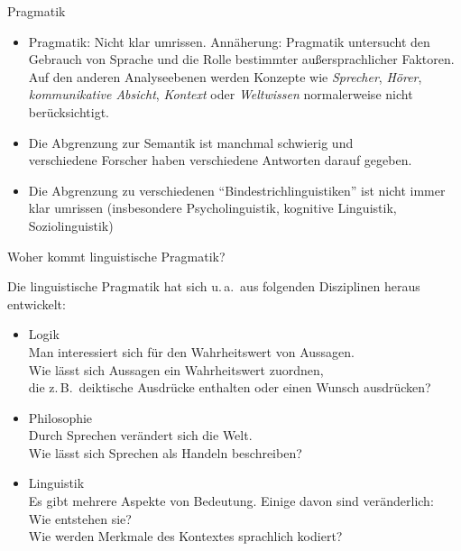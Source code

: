 \begin{frame}{Pragmatik}
  \begin{itemize}
  \item Pragmatik: Nicht klar umrissen. Annäherung: Pragmatik untersucht den Gebrauch von Sprache
    und die Rolle bestimmter außersprachlicher Faktoren.\\
        Auf den anderen Analyseebenen werden Konzepte wie \emph{Sprecher}, \emph{Hörer}, \emph{kommunikative Absicht}, \emph{Kontext} oder \emph{Weltwissen} normalerweise nicht berücksichtigt.
  \item<2-> Die Abgrenzung zur Semantik ist manchmal schwierig und\\
            verschiedene Forscher haben verschiedene Antworten darauf gegeben.
  \item<3-> Die Abgrenzung zu verschiedenen "`Bindestrichlinguistiken"' ist nicht immer klar umrissen (insbesondere Psycholinguistik, kognitive Linguistik, Soziolinguistik)
  \end{itemize}

\end{frame}


\begin{frame}{Woher kommt linguistische Pragmatik?}
  
Die linguistische Pragmatik hat sich u.\,a.\ aus folgenden Disziplinen heraus entwickelt:

\begin{itemize}
\item \alert{Logik}\\
  Man interessiert sich für den Wahrheitswert von Aussagen.\\
  Wie lässt sich Aussagen ein Wahrheitswert zuordnen,\\
  die z.\,B.\ deiktische Ausdrücke enthalten oder einen Wunsch ausdrücken?
\item<2-> \alert{Philosophie}\\
  Durch Sprechen verändert sich die Welt.\\
  Wie lässt sich Sprechen als Handeln beschreiben?
\item<3-> \alert{Linguistik}\\
  Es gibt mehrere Aspekte von Bedeutung. Einige davon sind veränderlich:\\
  Wie entstehen sie?\\
 Wie werden Merkmale des Kontextes sprachlich kodiert?
\end{itemize}

\end{frame}





